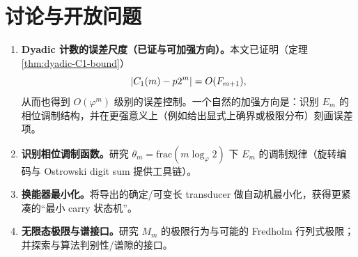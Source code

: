 
\section{讨论与开放问题}

\begin{enumerate}
\item \textbf{Dyadic 计数的误差尺度（已证与可加强方向）。}本文已证明（定理 \ref{thm:dyadic-C1-bound}）
$$
\left\lvert C_1(m)-p2^m\right\rvert=O(F_{m+1}),
$$
从而也得到 $O(\varphi^m)$ 级别的误差控制。一个自然的加强方向是：识别 $E_m$ 的相位调制结构，并在更强意义上（例如给出显式上确界或极限分布）刻画误差项。
\item \textbf{识别相位调制函数。}研究 $\theta_m=\mathrm{frac}(m\log_\varphi 2)$ 下 $E_m$ 的调制规律（旋转编码与 Ostrowski digit sum 提供工具链）。
\item \textbf{换能器最小化。}将导出的确定/可变长 transducer 做自动机最小化，获得更紧凑的“最小 carry 状态机”。
\item \textbf{无限态极限与谱接口。}研究 $M_m$ 的极限行为与可能的 Fredholm 行列式极限；并探索与算法判别性/谱隙的接口。
\end{enumerate}


